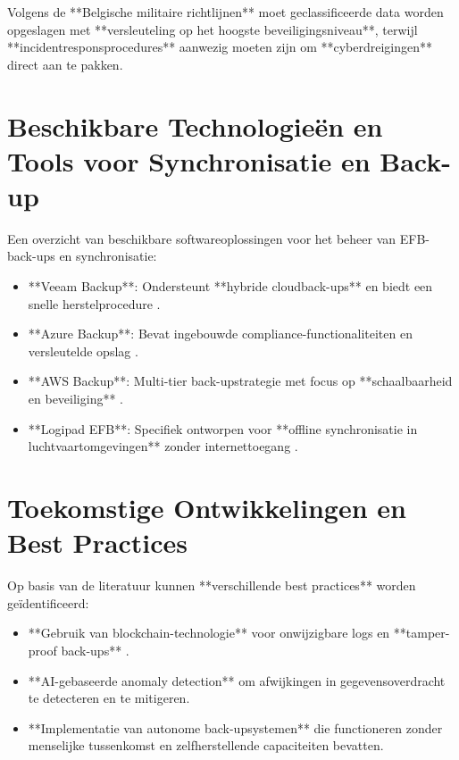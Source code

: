 \documentclass{hogent-article}
\begin{document}
    Volgens de **Belgische militaire richtlijnen** \autocite{ACISAPGSECVEIL001} moet geclassificeerde data worden opgeslagen met **versleuteling op het hoogste beveiligingsniveau**, terwijl **incidentresponsprocedures** aanwezig moeten zijn om **cyberdreigingen** direct aan te pakken.
    
    \section{Beschikbare Technologieën en Tools voor Synchronisatie en Back-up}
    
    Een overzicht van beschikbare softwareoplossingen voor het beheer van EFB-back-ups en synchronisatie:
    
    \begin{itemize}
        \item **Veeam Backup**: Ondersteunt **hybride cloudback-ups** en biedt een snelle herstelprocedure \autocite{VeeamRTO}.
        \item **Azure Backup**: Bevat ingebouwde compliance-functionaliteiten en versleutelde opslag \autocite{MicrosoftBackup}.
        \item **AWS Backup**: Multi-tier back-upstrategie met focus op **schaalbaarheid en beveiliging** \autocite{AWSBackup}.
        \item **Logipad EFB**: Specifiek ontworpen voor **offline synchronisatie in luchtvaartomgevingen** zonder internettoegang \autocite{LogipadEFB}.
    \end{itemize}
    
    \section{Toekomstige Ontwikkelingen en Best Practices}
    
    Op basis van de literatuur kunnen **verschillende best practices** worden geïdentificeerd:
    
    \begin{itemize}
        \item **Gebruik van blockchain-technologie** voor onwijzigbare logs en **tamper-proof back-ups** \autocite{VinayakBhuvi}.
        \item **AI-gebaseerde anomaly detection** om afwijkingen in gegevensoverdracht te detecteren en te mitigeren.
        \item **Implementatie van autonome back-upsystemen** die functioneren zonder menselijke tussenkomst en zelfherstellende capaciteiten bevatten.
    \end{itemize}
    
\end{document}
